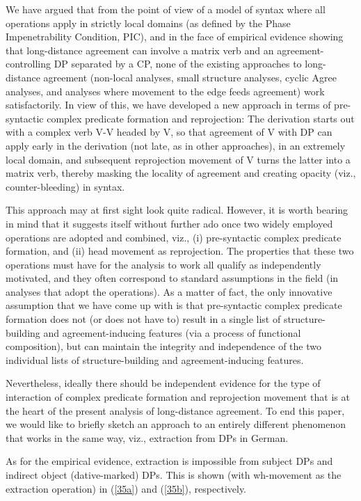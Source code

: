 \documentclass[output=paper
,modfonts
,nonflat]{langsci/langscibook}
\begin{document}
	We have argued that from the point of view of a model of syntax where
	all operations apply in strictly local domains (as defined by the
	Phase Impenetrability Condition, PIC), and in the face of empirical
	evidence showing that long-distance agreement can involve a matrix
	verb and an agreement-controlling DP separated by a CP, none of the
	existing approaches to long-distance agreement (non-local analyses,
	small structure analyses, cyclic Agree analyses, and analyses where
	movement to the edge feeds agreement) work satisfactorily. In view of
	this, we have developed a new approach in terms of pre-syntactic
	complex predicate formation and reprojection: The derivation starts
	out with a complex verb {V-V} headed by V, so that agreement
	of V with DP can apply early in the derivation (not late, as in
	other approaches), in an extremely local domain, and subsequent
	reprojection movement of V turns the latter into a matrix verb, thereby
	masking the locality of agreement and creating opacity (viz.,
	counter-bleeding) in syntax.  
	
	This approach may at first sight look quite radical. However, it is
	worth bearing in mind that it suggests itself without further ado once
	two widely employed operations are adopted and combined, viz., (i)
	pre-syntactic complex predicate formation, and (ii) head movement as
	reprojection. The properties that these two operations must have for
	the analysis to work all qualify as independently motivated, and they
	often correspond to standard assumptions in the field (in analyses
	that adopt the operations). As a matter of fact, the only innovative
	assumption that we have come up with is that pre-syntactic complex
	predicate formation does not (or does not have to) result in a single
	list of structure-building and agreement-inducing features (via a
	process of functional composition), but can maintain the integrity and
	independence of the two individual lists of structure-building and
	agreement-inducing features.
	
	Nevertheless, ideally there should be independent evidence for the
	type of interaction of complex predicate formation and reprojection
	movement that is at the heart of the present analysis of long-distance
	agreement. To end this paper, we would like to briefly sketch an
	approach to an entirely different phenomenon that works in the same
	way, viz., extraction from DPs in German. 
	
\noindent As for the empirical evidence, extraction is impossible from subject
	DPs and indirect object (dative-marked) DPs. This is shown (with
	wh-movement as the extraction operation) in (\ref{35a}) and (\ref{35b}),
	respectively.
	
\end{document}
